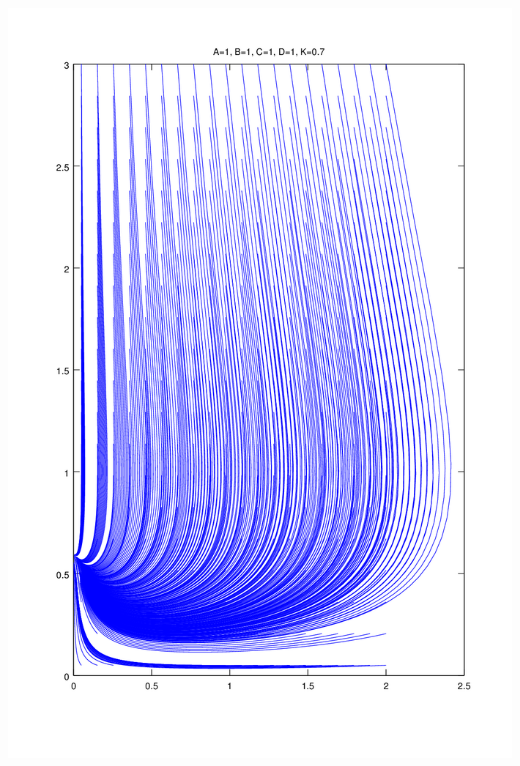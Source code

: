 \documentclass{article}
\begin{document}
\includegraphics[width=\textwidth]{plots/phase-potrait-past-degenerate.png}
\end{document}
